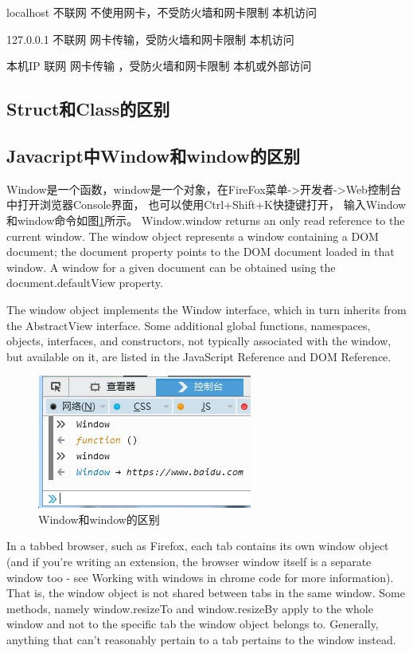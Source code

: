 \documentclass{book}
\begin{document}
localhost
不联网
不使用网卡，不受防火墙和网卡限制
本机访问

127.0.0.1
不联网
网卡传输，受防火墙和网卡限制
本机访问

本机IP
联网
网卡传输 ，受防火墙和网卡限制
本机或外部访问 

\subsection{Struct和Class的区别}

\subsection{Javacript中Window和window的区别}

Window是一个函数，window是一个对象，在FireFox菜单->开发者->Web控制台中打开浏览器Console界面，
也可以使用Ctrl+Shift+K快捷键打开，
输入Window和window命令如图\ref{figure:TheDiffOfWindow}所示。
Window.window returns an only read reference to the current window.
The window object represents a window containing a DOM document; 
the document property points to the DOM document loaded in that window. 
A window for a given document can be obtained using the document.defaultView property.

The window object implements the Window interface, 
which in turn inherits from the AbstractView interface. 
Some additional global functions, namespaces, objects, 
interfaces, and constructors, not typically associated with the window, 
but available on it, are listed in the JavaScript Reference and DOM Reference.

\begin{figure}[htbp]
	\centering
	\includegraphics[scale=0.8]{TheDifferenceOfWindow.jpg}
	\caption{Window和window的区别}
	\label{figure:TheDiffOfWindow}
\end{figure}

In a tabbed browser, such as Firefox, 
each tab contains its own window object (and if you're writing an extension, 
the browser window itself is a separate window too - see Working with windows in chrome code for more information). 
That is, the window object is not shared between tabs in the same window. 
Some methods, namely window.resizeTo and window.resizeBy 
apply to the whole window and not to the specific tab the window object belongs to. 
Generally, anything that can't reasonably pertain to a tab pertains to the window instead.
\end{document}
